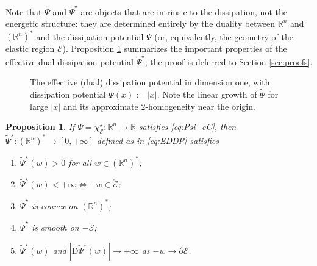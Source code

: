 \documentclass[reqno]{amsart}
\newtheorem{proposition}[theorem]{Proposition}
\theoremstyle{definition}
\begin{document}
Note that ${\widetilde{\Psi}}$ and ${\widetilde{\Psi}}^{\star}$ are objects that are intrinsic to the dissipation, not the energetic structure:  they are determined entirely by the duality between ${\mathbb{R}}^{n}$ and $({\mathbb{R}}^{n})^{\ast}$ and the dissipation potential $\Psi$ (or, equivalently, the geometry of the elastic region ${\mathcal{E}}$).  Proposition \ref{prop:EDDP} summarizes the important properties of the effective dual dissipation potential ${\widetilde{\Psi}}^{\star}$;  the proof is deferred to Section \ref{sec:proofs}.

\begin{figure}[t]
	\begin{center}
	  \caption{The effective (dual) dissipation potential in dimension one, with dissipation potential $\Psi(x) := | x |$.  Note the linear growth of ${\widetilde{\Psi}}$ for large $| x |$ and its approximate $2$-homogeneity near the origin.}
	  \label{fig:EDP}
	\end{center}
\end{figure}

\begin{proposition}
	\label{prop:EDDP}
	If $\Psi = \chi_{\mathcal{E}}^{\star} \colon {\mathbb{R}}^{n} \to {\mathbb{R}}$ satisfies \eqref{eq:Psi_cC}, then ${\widetilde{\Psi}}^{\star} \colon ({\mathbb{R}}^{n})^{\ast} \to [0, + \infty]$ defined as in \eqref{eq:EDDP} satisfies
	\begin{enumerate}
		\item ${\widetilde{\Psi}}^{\star}(w) > 0$ for all $w \in ({\mathbb{R}}^{n})^{\ast}$;
		\item ${\widetilde{\Psi}}^{\star}(w) < + \infty \iff -w \in \mathring{\mathcal{E}}$;
		\item ${\widetilde{\Psi}}^{\star}$ is convex on $({\mathbb{R}}^{n})^{\ast}$;
		\item ${\widetilde{\Psi}}^{\star}$ is smooth on $- \mathring{\mathcal{E}}$;
		\item ${\widetilde{\Psi}}^{\star}(w)$ and $| {\mathrm{D}} {\widetilde{\Psi}}^{\star}(w) | \to + \infty$ as $-w \to \partial {\mathcal{E}}$.
	\end{enumerate}
\end{proposition}
\end{document}
